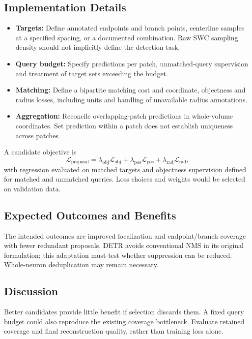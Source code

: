 \documentclass[11pt,a4paper]{article}
\begin{document}
\subsection{Implementation Details}
\begin{itemize}
    \item \textbf{Targets:} Define annotated endpoints and branch points, centerline samples at a specified spacing, or a documented combination. Raw SWC sampling density should not implicitly define the detection task.
    \item \textbf{Query budget:} Specify predictions per patch, unmatched-query supervision and treatment of target sets exceeding the budget.
    \item \textbf{Matching:} Define a bipartite matching cost and coordinate, objectness and radius losses, including units and handling of unavailable radius annotations.
    \item \textbf{Aggregation:} Reconcile overlapping-patch predictions in whole-volume coordinates. Set prediction within a patch does not establish uniqueness across patches.
\end{itemize}
A candidate objective is
\begin{equation}
    \mathcal{L}_{\mathrm{proposal}}
    = \lambda_{\mathrm{obj}}\mathcal{L}_{\mathrm{obj}}
    + \lambda_{\mathrm{pos}}\mathcal{L}_{\mathrm{pos}}
    + \lambda_{\mathrm{rad}}\mathcal{L}_{\mathrm{rad}},
\end{equation}
with regression evaluated on matched targets and objectness supervision defined for matched and unmatched queries. Loss choices and weights would be selected on validation data.

\subsection{Expected Outcomes and Benefits}
The intended outcomes are improved localization and endpoint/branch coverage with fewer redundant proposals. DETR avoids conventional NMS in its original formulation; this adaptation must test whether suppression can be reduced. Whole-neuron deduplication may remain necessary.

\subsection{Discussion}
Better candidates provide little benefit if selection discards them. A fixed query budget could also reproduce the existing coverage bottleneck. Evaluate retained coverage and final reconstruction quality, rather than training loss alone.
\end{document}
